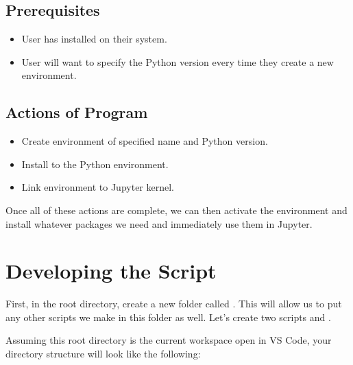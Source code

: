 \documentclass[letterpaper,12pt,english]{sphinxmanual}
\begin{document}
\subsection{Prerequisites}
\label{\detokenize{notebooks/01-automating-setup:prerequisites}}\begin{itemize}
\item {} 
\sphinxAtStartPar
User has  installed on their system.

\item {} 
\sphinxAtStartPar
User will want to specify the Python version every time they create a new environment.

\end{itemize}


\subsection{Actions of Program}
\label{\detokenize{notebooks/01-automating-setup:actions-of-program}}\begin{itemize}
\item {} 
\sphinxAtStartPar
Create environment of specified name and Python version.

\item {} 
\sphinxAtStartPar
Install  to the Python environment.

\item {} 
\sphinxAtStartPar
Link environment to Jupyter kernel.

\end{itemize}

\sphinxAtStartPar
Once all of these actions are complete, we can then activate the environment and install whatever packages we need and immediately use them in Jupyter.


\section{Developing the Script}
\label{\detokenize{notebooks/01-automating-setup:developing-the-script}}
\sphinxAtStartPar
First, in the root directory, create a new folder called . This will allow us to put any other scripts we make in this folder as well. Let’s create two scripts  and .

\sphinxAtStartPar
Assuming this root directory is the current workspace open in VS Code, your directory structure will look like the following:
\end{document}
